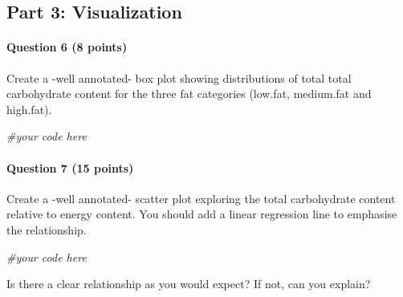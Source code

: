 \documentclass[
  a4paper]{article}
\newenvironment{Shaded}{\begin{snugshade}}{\end{snugshade}}
\newcommand{\CommentTok}[1]{\textcolor[rgb]{0.56,0.35,0.01}{\textit{#1}}}
\begin{document}
\hypertarget{part-3-visualization}{%
\subsection{Part 3: Visualization}\label{part-3-visualization}}

\hypertarget{question-6-8-points}{%
\paragraph{Question 6 (8 points)}\label{question-6-8-points}}

Create a -well annotated- box plot showing distributions of total total
carbohydrate content for the three fat categories (low.fat, medium.fat
and high.fat).

\begin{Shaded}
\begin{Highlighting}[]
\CommentTok{#your code here}
\end{Highlighting}
\end{Shaded}

\hypertarget{question-7-15-points}{%
\paragraph{Question 7 (15 points)}\label{question-7-15-points}}

Create a -well annotated- scatter plot exploring the total carbohydrate
content relative to energy content. You should add a linear regression
line to emphasise the relationship.

\begin{Shaded}
\begin{Highlighting}[]
\CommentTok{#your code here}
\end{Highlighting}
\end{Shaded}

Is there a clear relationship as you would expect? If not, can you
explain?
\end{document}

